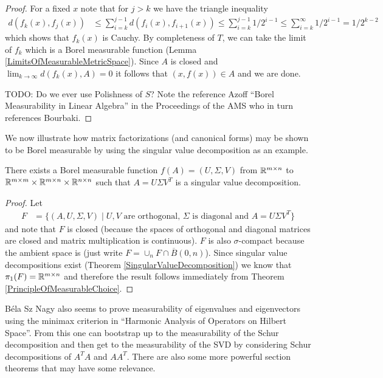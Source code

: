 \begin{proof}
For a fixed $x$ note that for $j > k$ we have the triangle inequality
\begin{align*}
d(f_k(x), f_j(x)) &\leq \sum_{i=k}^{j-1} d(f_i(x), f_{i+1}(x)) \leq \sum_{i=k}^{j-1} 1/2^{i-1} \leq \sum_{i=k}^\infty 1/2^{i-1} = 1/2^{k-2}
\end{align*}
which shows that $f_k(x)$ is Cauchy.  By completeness of $T$, we can take 
the limit of $f_k$ which is a Borel measurable function (Lemma \ref{LimitsOfMeasurableMetricSpace}).  Since $A$ is closed and $\lim_{k \to \infty} d(f_k(x), A) = 0$ it follows that $(x,f(x)) \in A$ and we are done.

TODO: Do we ever use Polishness of $S$?  Note the reference Azoff ``Borel Measurability in Linear Algebra'' in the Proceedings of the AMS who in turn references Bourbaki.
\end{proof}

We now illustrate how matrix factorizations (and canonical forms) may be shown to be Borel measurable by using the singular value decomposition as an example.  
\begin{cor}\label{BorelMeasurabilitySVD}There exists a Borel measurable function $f (A) = (U,\Sigma,V)$ from  $\mathbb{R}^{m\times n}$ to $\mathbb{R}^{m \times m} \times \mathbb{R}^{m \times n} \times \mathbb{R}^{n \times n}$ such that $A = U \Sigma V^T$ is a singular value decomposition.
\end{cor}
\begin{proof}
Let 
\begin{align*}
F &= \lbrace (A, U,\Sigma, V) \mid \text{$U, V$ are orthogonal, $\Sigma$ is diagonal and $A = U \Sigma V^T$} \rbrace
\end{align*}
and note that $F$ is closed (because the spaces of orthogonal and diagonal matrices are closed and matrix multiplication is continuous).  $F$ is also $\sigma$-compact because the ambient space is (just write $F = \cup_n F \cap \overline{B}(0,n)$).  Since singular value decompositions exist (Theorem \ref{SingularValueDecomposition}) we know that $\pi_1(F) = \mathbb{R}^{m \times n}$ and therefore the result follows immediately from Theorem \ref{PrincipleOfMeasurableChoice}.
\end{proof}

B\'{e}la Sz Nagy also seems to prove measurability of eigenvalues and eigenvectors using the minimax criterion in ``Harmonic Analysis of Operators on Hilbert Space''.  From this one can bootstrap up to the measurability of the Schur decomposition and then get to the measurability of the SVD by considering Schur decompositions of $A^TA$ and $AA^T$.  There are also some more powerful section theorems that may have some relevance.

